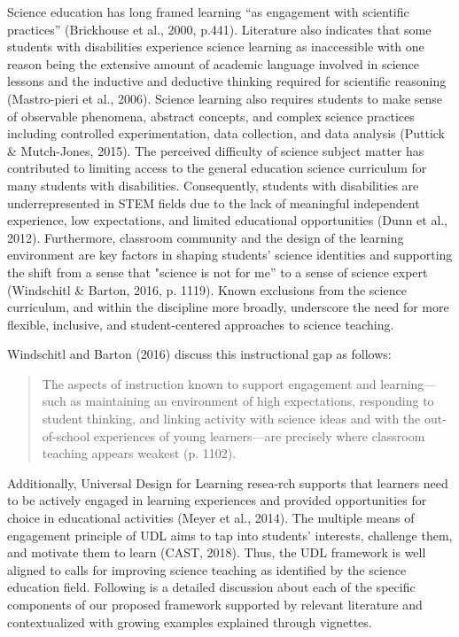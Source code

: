 \documentclass[11.5pt]{sig-alternate}
\begin{document}
\begin{large}
Science education has long framed learning “as engagement with scientific practices” (Brickhouse et al., 2000, p.441). Literature also indicates that some students with disabilities experience science learning as inaccessible with one reason being the extensive amount of academic language involved in science lessons and the inductive and deductive thinking required for scientific reasoning (Mastro-pieri et al., 2006). Science learning also requires students to make sense of observable phenomena, abstract concepts, and complex science practices including controlled experimentation, data collection, and data analysis (Puttick \& Mutch-Jones, 2015). The perceived difficulty of science subject matter has contributed to limiting access to the general education science curriculum for many students with disabilities. Consequently, students with disabilities are underrepresented in STEM fields due to the lack of meaningful independent experience, low expectations, and limited educational opportunities (Dunn et al., 2012). Furthermore, classroom community and the design of the learning environment are key factors in shaping students’ science identities and supporting the shift from a sense that "science is not for me” to a sense of science expert (Windschitl \& Barton, 2016, p. 1119). Known exclusions from the science curriculum, and within the discipline more broadly, underscore the need for more flexible, inclusive, and student-centered approaches to science teaching. 

Windschitl and Barton (2016) discuss this instructional gap as follows:

\begin{quotation}
    The aspects of instruction known to support engagement and learning— such as maintaining an environment of high expectations, responding to student thinking, and linking activity with science ideas and with the out-of-school experiences of young learners—are precisely where classroom teaching appears weakest (p. 1102).
\end{quotation}

Additionally, Universal Design for Learning resea-rch supports that learners need to be actively engaged in learning experiences and provided opportunities for choice in educational activities (Meyer et al., 2014). The multiple means of engagement principle of UDL aims to tap into students’ interests, challenge them, and motivate them to learn (CAST, 2018). Thus, the UDL framework is well aligned to calls for improving science teaching as identified by the science education field. Following is a detailed discussion about each of the specific components of our proposed framework supported by relevant literature and contextualized with growing examples explained through vignettes. 


\end{large}
\end{document}
